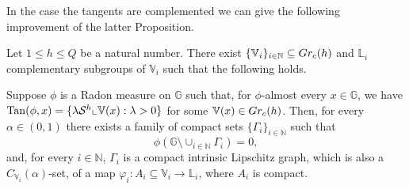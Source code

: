 \documentclass[10pt, a4paper,
oneside, headinclude,footinclude]{scrartcl}
\begin{document}
In the case the tangents are complemented we can give the following improvement of the latter Proposition.
\begin{proposizione}\label{prop:TangentCompemented}
Let $1\leq h\leq Q$ be a natural number. There exist $\{\mathbb V_i\}_{i\in\mathbb N}\subseteq Gr_c(h)$ and $\mathbb L_i$ complementary subgroups of $\mathbb V_i$ such that the following holds.

Suppose $\phi$ is a Radon measure on $\mathbb{G}$ such that, for $\phi$-almost every $x\in\mathbb G$, we have $\mathrm{Tan}(\phi,x)=\{\lambda\mathcal{S}^h\llcorner \mathbb{V}(x):\lambda>0\}$ for some $\mathbb{V}(x)\in Gr_c(h)$. Then, for every $\alpha\in(0,1)$ there exists a family of compact sets $\{\Gamma_i\}_{i\in\mathbb N}$ such that 
$$
\phi(\mathbb G\setminus \cup_{i\in\mathbb N}\Gamma_i)=0,
$$
and, for every $i\in\mathbb N$, $\Gamma_i$ is a compact intrinsic Lipschitz graph, which is also a $C_{\mathbb V_i}(\alpha)$-set, of a map $\varphi_i:A_i\subseteq \mathbb V_i\to\mathbb L_i$, where $A_i$ is compact.
\end{proposizione}
\end{document}
